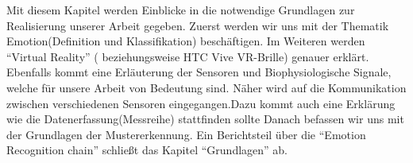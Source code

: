
Mit diesem Kapitel werden Einblicke in die notwendige Grundlagen zur Realisierung unserer Arbeit gegeben. Zuerst werden wir uns mit der Thematik Emotion(Definition und Klassifikation) beschäftigen. Im Weiteren werden ``Virtual Reality'' ( beziehungsweise HTC Vive VR-Brille) genauer erklärt. Ebenfalls kommt eine Erläuterung der Sensoren und Biophysiologische Signale, welche für unsere Arbeit von Bedeutung sind. Näher wird auf die Kommunikation zwischen verschiedenen Sensoren eingegangen.Dazu kommt auch eine Erklärung wie die Datenerfassung(Messreihe) stattfinden sollte
 Danach befassen wir uns mit der Grundlagen der Mustererkennung. Ein Berichtsteil über die ``Emotion Recognition chain'' schließt das Kapitel ``Grundlagen'' ab.












